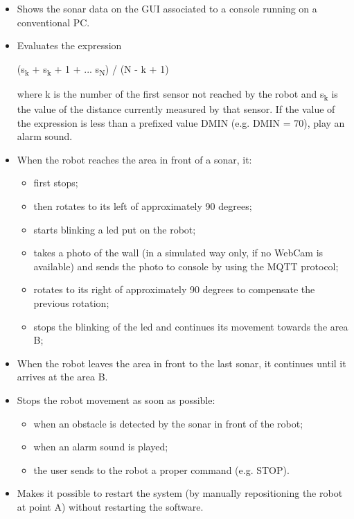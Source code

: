 \documentclass[a4paper]{article}
\begin{document}
\begin{itemize}
	\item Shows the sonar data on the GUI associated to a console running on a conventional PC.
	\item Evaluates the expression
	
	(s\textsubscript{k} + s\textsubscript{k} + 1 + ... s\textsubscript{N}) / (N - k + 1)
	
	where k is the number of the first sensor not reached by the robot and s\textsubscript{k} is the value of the distance currently measured by that sensor. If the value of the expression is less than a prefixed value DMIN (e.g. DMIN = 70), play an alarm sound.
	\item When the robot reaches the area in front of a sonar, it:
	\begin{itemize}
		\item first stops;
		\item then rotates to its left of approximately 90 degrees;
		\item starts blinking a led put on the robot;
		\item takes a photo of the wall (in a simulated way only, if no WebCam is available) and sends the photo to console by using the MQTT protocol;
		\item rotates to its right of approximately 90 degrees to compensate the previous rotation;
		\item stops the blinking of the led and continues its movement towards the area B;
	\end{itemize}
	\item When the robot leaves the area in front to the last sonar, it continues until it arrives at the area B.
	\item Stops the robot movement as soon as possible:
	\begin{itemize}
		\item when an obstacle is detected by the sonar in front of the robot;
		\item when an alarm sound is played;
		\item the user sends to the robot a proper command (e.g. STOP).
	\end{itemize}
	\item Makes it possible to restart the system (by manually repositioning the robot at point A) without restarting the software.
\end{itemize}



\end{document}
